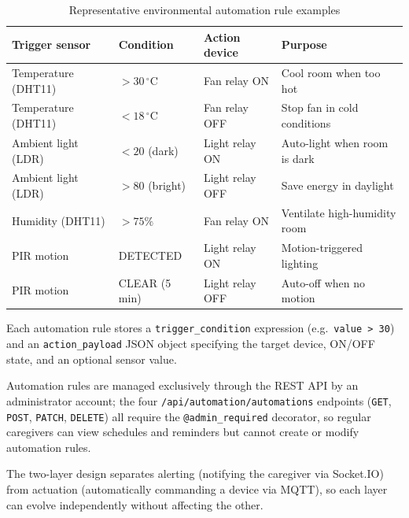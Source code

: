 \begin{table}[H]
\centering
\caption[Environmental automation rule examples]{Representative environmental automation rule examples}
\label{tab:automation_examples}
\small
\begin{tabularx}{\textwidth}{@{} >{\RaggedRight\arraybackslash}p{3.4cm}
                                  >{\RaggedRight\arraybackslash}p{2.6cm}
                                  >{\RaggedRight\arraybackslash}p{2.8cm}
                                  >{\RaggedRight\arraybackslash}X @{}}
\toprule
\textbf{Trigger sensor} & \textbf{Condition} & \textbf{Action device} & \textbf{Purpose} \\
\midrule
Temperature (DHT11)  & $> 30\,^\circ$C   & Fan relay ON      & Cool room when too hot \\
Temperature (DHT11)  & $< 18\,^\circ$C   & Fan relay OFF     & Stop fan in cold conditions \\
Ambient light (LDR)  & $< 20$ (dark)     & Light relay ON    & Auto-light when room is dark \\
Ambient light (LDR)  & $> 80$ (bright)   & Light relay OFF   & Save energy in daylight \\
Humidity (DHT11)     & $> 75\%$          & Fan relay ON      & Ventilate high-humidity room \\
PIR motion           & DETECTED          & Light relay ON    & Motion-triggered lighting \\
PIR motion           & CLEAR (5 min)     & Light relay OFF   & Auto-off when no motion \\
\bottomrule
\end{tabularx}
\end{table}

Each automation rule stores a \texttt{trigger\_condition} expression (e.g.\ \texttt{value > 30}) and an \texttt{action\_payload} JSON object specifying the target device, ON/OFF state, and an optional sensor value.

Automation rules are managed exclusively through the REST API by an
administrator account; the four \texttt{/api/automation/automations} endpoints
(\texttt{GET}, \texttt{POST}, \texttt{PATCH}, \texttt{DELETE}) all require the
\texttt{@admin\_required} decorator, so regular caregivers can view schedules
and reminders but cannot create or modify automation rules.

The two-layer design separates alerting (notifying the caregiver via Socket.IO) from actuation (automatically commanding a device via MQTT), so each layer can evolve independently without affecting the other.

